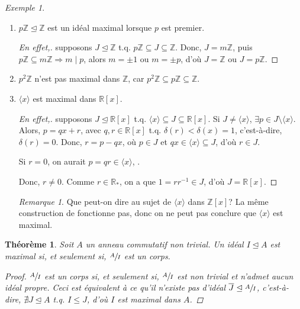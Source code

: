 \documentclass{report}
\newtheorem*{thm}{Th\'eor\`eme}
\theoremstyle{definition}
\theoremstyle{remark}
\newtheorem*{exem}{Exemple}
\newtheorem*{rmq}{Remarque}
\def\lte{\leqslant}
\def\ZZ{\mathbb{Z}}
\def\RR{\mathbb{R}}
\begin{document}
	\begin{exem}
		\begin{enumerate}
			\item $p\ZZ\trianglelefteq\ZZ$ est un id\'eal maximal lorsque $p$ est premier.
			\begin{proof}[En effet,]
				supposons $J\trianglelefteq\ZZ$ t.q. $p\ZZ\subseteq J\subseteq\ZZ$. Donc, $J=m\ZZ$, puis $p\ZZ\subseteq m\ZZ \Longrightarrow m \mid p$, alors $m=\pm1$ ou $m=\pm p$, d'o\`u $J=\ZZ$ ou $J=p\ZZ$.
			\end{proof}
			\item $p^2\ZZ$ n'est pas maximal dans $\ZZ$, car $p^2\ZZ\subseteq p\ZZ\subseteq \ZZ$.
			\item $\langle x \rangle$ est maximal dans $\RR[x]$.
			\begin{proof}[En effet,]
				supposons $J\trianglelefteq\RR[x]$ t.q. $\langle x \rangle \subseteq J \subseteq \RR[x]$. Si $J\neq\langle x \rangle$, $\exists p\in J\setminus\langle x \rangle$. Alors, $p=qx+r$, avec $q,r\in\RR[x]$ t.q. $\delta(r)<\delta(x)=1$, c'est-\`a-dire, $\delta(r)=0$. Donc, $r=p-qx$, o\`u $p\in J$ et $qx\in\langle x \rangle\subseteq J$, d'o\`u $r\in J$.

				Si $r=0$, on aurait $p=qr\in\langle x \rangle$, \lightning.

				Donc, $r\neq0$. Comme $r\in\RR_*$, on a que $1=rr^{-1}\in J$, d'o\`u $J=\RR[x]$.
			\end{proof}
			\begin{rmq}
				Que peut-on dire au sujet de $\langle x \rangle$ dans $\ZZ[x]$? La m\^eme construction de fonctionne pas, donc on ne peut pas conclure que $\langle x \rangle$ est maximal.
			\end{rmq}
		\end{enumerate}
	\end{exem}

	\begin{thm}
		Soit $A$ un anneau commutatif non trivial. Un id\'eal $I\trianglelefteq A$ est maximal si, et seulement si, $\sfrac{A}{I}$ est un corps.
		\begin{proof}
			$\sfrac{A}{I}$ est un corps si, et seulement si, $\sfrac{A}{I}$ est non trivial et n'admet aucun id\'eal propre. Ceci est \'equivalent \`a ce qu'il n'existe pas d'id\'eal $\overline{J}\trianglelefteq\sfrac{A}{I}$, c'est-\`a-dire, $\nexists J\trianglelefteq A$ t.q. $I\lte J$, d'o\`u $I$ est maximal dans $A$.
		\end{proof}
	\end{thm}
\end{document}
